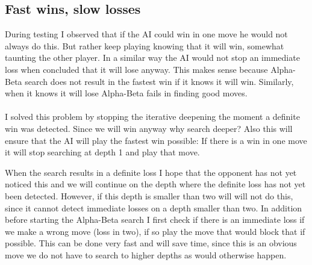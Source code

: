\documentclass{article}
\begin{document}
\subsection{Fast wins, slow losses}
During testing I observed that if the AI could win in one move he would not always do this. But rather keep playing knowing that it will win, somewhat taunting the other player. In a similar way the AI would not stop an immediate loss when concluded that it will lose anyway. This makes sense because Alpha-Beta search does not result in the fastest win if it knows it will win. Similarly, when it knows it will lose Alpha-Beta fails in finding good moves. \\
\\
I solved this problem by stopping the iterative deepening the moment a definite win was detected. Since we will win anyway why search deeper? Also this will ensure that the AI will play the fastest win possible: If there is a win in one move it will stop searching at depth 1 and play that move.

When the search results in a definite loss I hope that the opponent has not yet noticed this and we will continue on the depth where the definite loss has not yet been detected. However, if this depth is smaller than two will will not do this, since it cannot detect immediate losses on a depth smaller than two. In addition before starting the Alpha-Beta search I first check if there is an immediate loss if we make a wrong move (loss in two), if so play the move that would block that if possible. This can be done very fast and will save time, since this is an obvious move we do not have to search to higher depths as would otherwise happen. 


\end{document}
